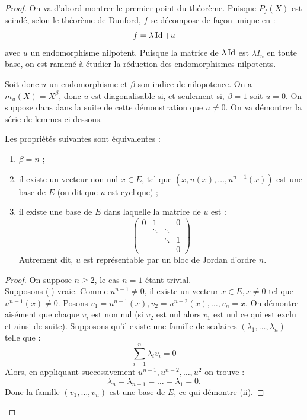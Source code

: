 \documentclass{article}
\begin{document}
\begin{proof}
On va d'abord montrer le premier point du théorème. Puisque $P_f(X)$ est scindé, selon le théorème de Dunford, 
$f$ se décompose de façon unique en :
\[ f = \lambda \operatorname{Id} + u \]
avec $u$ un endomorphisme nilpotent. Puisque la matrice de $\lambda \operatorname{Id}$ est $\lambda I_n$ en toute base, 
on est ramené à étudier la réduction des endomorphismes nilpotents. \newline

Soit donc $u$ un endomorphisme et $\beta$ son indice de nilopotence. On a $m_u(X) = X^{\beta}$, donc $u$ est diagonalisable si,
et seulement si, $\beta=1$ soit $u=0$. On suppose dans dans la suite de cette démonstration que $u \neq 0$. 
On va démontrer la série de lemmes ci-dessous.

\begin{lem}
\label{lem:fonda}
Les propriétés suivantes sont équivalentes :

\begin{enumerate}[label=(\roman*)]

\item $\beta = n$ ;
\item il existe un vecteur non nul $x \in E$, tel que $(x, u(x), \dots, u^{n-1}(x))$ est une base de $E$ (on dit que $u$ est cyclique) ;
\item il existe une base de $E$ dans laquelle la matrice de $u$ est :
\[ \begin{pmatrix}
0 & 1 &  & 0 \\
 & \ddots & \ddots &  \\
 & & \ddots & 1 \\
  & & & 0
\end{pmatrix} \]
Autrement dit, $u$ est représentable par un bloc de Jordan d'ordre $n$.
\end{enumerate}
\end{lem}

\begin{proof}
On suppose $n \geq 2$, le cas $n=1$ étant trivial. \\
Supposons (i) vraie. Comme $u^{n-1} \neq 0$, il existe un vecteur $x \in E, x \neq 0$ tel que $u^{n-1}(x) \neq 0$. 
Posons $v_1 = u^{n-1}(x), v_2 = u^{n-2}(x), \dots, v_n = x$. On démontre aisément que chaque $v_i$ est non nul 
(si $v_2$ est nul alors $v_1$ est nul ce qui est exclu et ainsi de suite).
Supposons qu'il existe une famille de scalaires $(\lambda_1, \dots, \lambda_n)$ telle que :
\[ \sum_{i=1}^n \lambda_i v_i = 0 \]
Alors, en appliquant successivement $u^{n-1}, u^{n-2}, \dots, u^2$ on trouve :
\[ \lambda_n = \lambda_{n-1} = \dots = \lambda_1 = 0 . \]
Donc la famille $(v_1, \dots, v_n)$ est une base de $E$, ce qui démontre (ii). \newline


\end{proof}
\end{proof}
\end{document}
